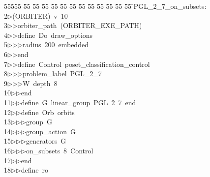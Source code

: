 %
%
\begin{tabbing}
55555 \= 55 \= 55 \= 55 \= 55 \= 55 \= 55 \= 55 \= 55 \= 55 \= 55 \= 55 \= 55 \= \>PGL\_2\_7\_on\_subsets:\\[0pt]
2\>$\triangleright$\>(ORBITER)\ v\ 10\ \\[0pt]
3\>$\triangleright$\>$\triangleright$\>orbiter\_path\ (ORBITER\_EXE\_PATH)\ \\[0pt]
4\>$\triangleright$\>$\triangleright$\>define\ Do\ draw\_options\ \\[0pt]
5\>$\triangleright$\>$\triangleright$\>$\triangleright$\>radius\ 200\ embedded\ \\[0pt]
6\>$\triangleright$\>$\triangleright$\>end\ \\[0pt]
7\>$\triangleright$\>$\triangleright$\>define\ Control\ poset\_classification\_control\ \\[0pt]
8\>$\triangleright$\>$\triangleright$\>$\triangleright$\>problem\_label\ PGL\_2\_7\ \\[0pt]
9\>$\triangleright$\>$\triangleright$\>$\triangleright$\>W\ depth\ 8\ \\[0pt]
10\>$\triangleright$\>$\triangleright$\>end\ \\[0pt]
11\>$\triangleright$\>$\triangleright$\>define\ G\ linear\_group\ PGL\ 2\ 7\ end\ \\[0pt]
12\>$\triangleright$\>$\triangleright$\>define\ Orb\ orbits\ \\[0pt]
13\>$\triangleright$\>$\triangleright$\>$\triangleright$\>group\ G\ \\[0pt]
14\>$\triangleright$\>$\triangleright$\>$\triangleright$\>group\_action\ G\ \\[0pt]
15\>$\triangleright$\>$\triangleright$\>$\triangleright$\>generators\ G\ \\[0pt]
16\>$\triangleright$\>$\triangleright$\>$\triangleright$\>on\_subsets\ 8\ Control\ \\[0pt]
17\>$\triangleright$\>$\triangleright$\>end\ \\[0pt]
18\>$\triangleright$\>$\triangleright$\>define\ ro\ \\[0pt]

\end{tabbing}
